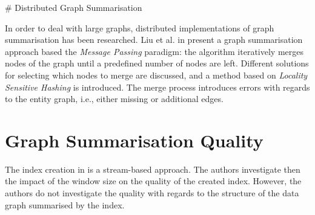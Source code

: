 \# Distributed Graph Summarisation

In order to deal with large graphs, distributed implementations of graph summarisation has been researched.
Liu et al. in \cite{liu:cikm:2014} present a graph summarisation approach based the \emph{Message Passing} paradigm: the algorithm iteratively merges nodes of the graph until a predefined number of nodes are left. Different solutions for selecting which nodes to merge are discussed, and a method based on \emph{Locality Sensitive Hashing} is introduced. The merge process introduces errors with regards to the entity graph, i.e., either missing or additional edges.

\section{Graph Summarisation Quality}

The index creation in \cite{konrath:jws:2012} is a stream-based approach. The authors investigate then the impact of the window size on the quality of the created index. However, the authors do not investigate the quality with regards to the structure of the data graph summarised by the index.
